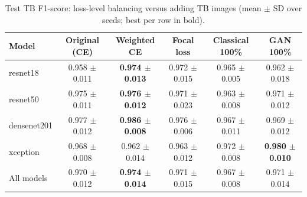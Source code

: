 \begin{table}[htbp]
\centering
\caption{Test TB F1-score: loss-level balancing versus adding TB images (mean $\pm$ SD over seeds; best per row in bold).}
\label{tab:loss_tb_f1}
\begin{tabular}{lccccc}
\toprule
Model & Original (CE) & Weighted CE & Focal loss & Classical 100\% & GAN 100\% \\
\midrule
resnet18 & 0.958 $\pm$ 0.011 & \textbf{0.974 $\pm$ 0.013} & 0.972 $\pm$ 0.015 & 0.965 $\pm$ 0.005 & 0.962 $\pm$ 0.018 \\
resnet50 & 0.975 $\pm$ 0.011 & \textbf{0.976 $\pm$ 0.012} & 0.971 $\pm$ 0.023 & 0.963 $\pm$ 0.008 & 0.971 $\pm$ 0.012 \\
densenet201 & 0.977 $\pm$ 0.012 & \textbf{0.986 $\pm$ 0.008} & 0.976 $\pm$ 0.006 & 0.967 $\pm$ 0.011 & 0.969 $\pm$ 0.012 \\
xception & 0.968 $\pm$ 0.008 & 0.962 $\pm$ 0.014 & 0.963 $\pm$ 0.012 & 0.972 $\pm$ 0.008 & \textbf{0.980 $\pm$ 0.010} \\
\midrule
All models & 0.970 $\pm$ 0.012 & \textbf{0.974 $\pm$ 0.014} & 0.971 $\pm$ 0.015 & 0.967 $\pm$ 0.008 & 0.971 $\pm$ 0.014 \\
\bottomrule
\end{tabular}
\end{table}